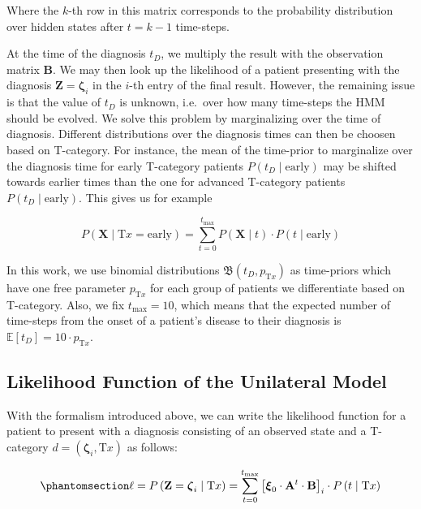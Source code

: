 \documentclass[
  sn-mathphys-num,
]{sn-jnl}
\begin{document}
Where the \(k\)-th row in this matrix corresponds to the probability
distribution over hidden states after \(t=k-1\) time-steps.

At the time of the diagnosis \(t_D\), we multiply the result with the
observation matrix \(\mathbf{B}\). We may then look up the likelihood of
a patient presenting with the diagnosis
\(\mathbf{Z}=\boldsymbol{\zeta}_i\) in the \(i\)-th entry of the final
result. However, the remaining issue is that the value of \(t_D\) is
unknown, i.e.~over how many time-steps the HMM should be evolved. We
solve this problem by marginalizing over the time of diagnosis.
Different distributions over the diagnosis times can then be choosen
based on T-category. For instance, the mean of the time-prior to
marginalize over the diagnosis time for early T-category patients
\(P\left( t_D \mid \text{early} \right)\) may be shifted towards earlier
times than the one for advanced T-category patients
\(P\left( t_D \mid \text{early} \right)\). This gives us for example

\[
P\left( \mathbf{X} \mid \text{T}x = \text{early} \right) = \sum_{t=0}^{t_\text{max}} P \left( \mathbf{X} \mid t \right) \cdot P(t \mid \text{early})
\]

In this work, we use binomial distributions
\(\mathfrak{B} \left( t_D, p_{\text{T}x} \right)\) as time-priors which
have one free parameter \(p_{\text{T}x}\) for each group of patients we
differentiate based on T-category. Also, we fix \(t_\text{max} = 10\),
which means that the expected number of time-steps from the onset of a
patient's disease to their diagnosis is
\(\mathbb{E}\left[ t_D \right] = 10 \cdot p_{\text{T}x}\).

\subsection{Likelihood Function of the Unilateral
Model}\label{likelihood-function-of-the-unilateral-model}

With the formalism introduced above, we can write the likelihood
function for a patient to present with a diagnosis consisting of an
observed state and a T-category
\(d = \left( \boldsymbol{\zeta}_i, \text{T}x \right)\) as follows:

\begin{equation}\phantomsection\label{eq-single-patient-llh}{
\ell = P \left( \mathbf{Z} = \boldsymbol{\zeta}_i \mid \text{T}x \right) = \sum_{t=0}^{t_\text{max}} \left[ \boldsymbol{\xi}_0 \cdot \mathbf{A}^t \cdot \mathbf{B} \right]_i \cdot P \left( t \mid \text{T}x \right)
}\end{equation}
\end{document}
